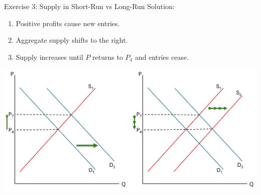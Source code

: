 \documentclass[9pt, handout]{beamer}
\begin{document}
\begin{frame}{Exercise 3: Supply in Short-Run vs Long-Run}
    Solution:
    \begin{enumerate}
        \item Positive profits cause new entries.
        \item Aggregate supply shifts to the right.
        \item Supply increases until $P$ returns to $P_4$ and entries cease.
    \end{enumerate}
    \includegraphics[width=\linewidth]{supply_increases.png}
\end{frame}
\end{document}
